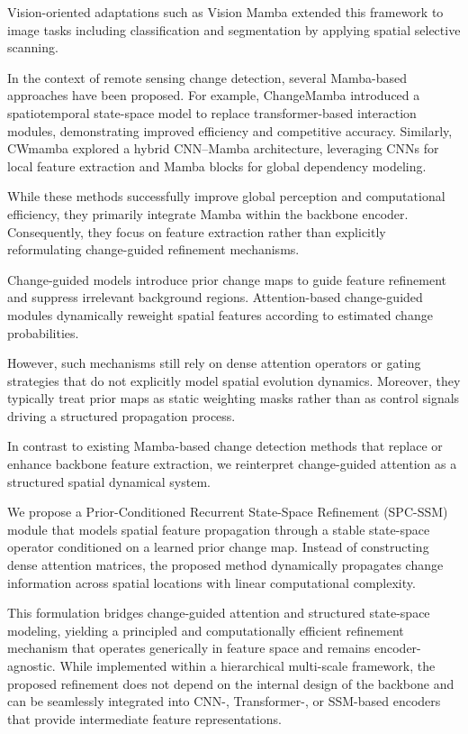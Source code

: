 \documentclass[10pt,conference]{IEEEtran}
\begin{document}
Vision-oriented adaptations such as Vision Mamba \cite{zhu2024vision} extended this framework to image tasks including classification and segmentation by applying spatial selective scanning.

In the context of remote sensing change detection, several Mamba-based approaches have been proposed. For example, ChangeMamba \cite{chen2024changemamba} introduced a spatiotemporal state-space model to replace transformer-based interaction modules, demonstrating improved efficiency and competitive accuracy. Similarly, CWmamba explored a hybrid CNN–Mamba architecture, leveraging CNNs for local feature extraction and Mamba blocks for global dependency modeling.

While these methods successfully improve global perception and computational efficiency, they primarily integrate Mamba within the backbone encoder. Consequently, they focus on feature extraction rather than explicitly reformulating change-guided refinement mechanisms.


Change-guided models introduce prior change maps to guide feature refinement and suppress irrelevant background regions. Attention-based change-guided modules dynamically reweight spatial features according to estimated change probabilities.

However, such mechanisms still rely on dense attention operators or gating strategies that do not explicitly model spatial evolution dynamics. Moreover, they typically treat prior maps as static weighting masks rather than as control signals driving a structured propagation process.


In contrast to existing Mamba-based change detection methods that replace or enhance backbone feature extraction, we reinterpret change-guided attention as a structured spatial dynamical system.

We propose a Prior-Conditioned Recurrent State-Space Refinement (SPC-SSM) module that models spatial feature propagation through a stable state-space operator conditioned on a learned prior change map. Instead of constructing dense attention matrices, the proposed method dynamically propagates change information across spatial locations with linear computational complexity.

This formulation bridges change-guided attention and structured state-space modeling, yielding a principled and computationally efficient refinement mechanism that operates generically in feature space and remains encoder-agnostic. While implemented within a hierarchical multi-scale framework, the proposed refinement does not depend on the internal design of the backbone and can be seamlessly integrated into CNN-, Transformer-, or SSM-based encoders that provide intermediate feature representations.
\end{document}
